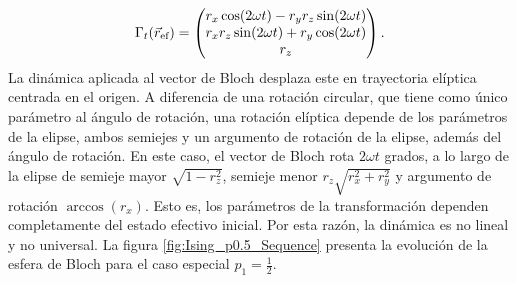 \begin{equation}\label{eq:EffectiveIsing2BV}
    \Gamma_{t}(\vec{r}_{\text{ef}})=\begin{pmatrix}
        r_{x}\cos(2\omega t)-r_{y}r_{z}\sin(2\omega t)\\
        r_{x}r_{z}\sin(2\omega t)+r_{y}\cos(2\omega t)\\
        r_{z}\\
    \end{pmatrix}.
\end{equation}
La dinámica aplicada al vector de Bloch desplaza este en trayectoria elíptica centrada en el origen. A diferencia de una rotación circular, que tiene como único parámetro al ángulo de rotación, una rotación elíptica depende de los parámetros de la elipse, ambos semiejes y un argumento de rotación de la elipse, además del ángulo de rotación. En este caso, el vector de Bloch rota $2\omega t$ grados, a lo largo de la elipse de semieje mayor $\sqrt{1-r_{z}^2}$, semieje menor $r_{z}\sqrt{r_{x}^2+r_{y}^2}$ y argumento de rotación $\arccos(r_{x})$. Esto es, los parámetros de la transformación dependen completamente del estado efectivo inicial. Por esta razón, la dinámica es no lineal y no universal. La figura \ref{fig:Ising_p0.5_Sequence} presenta la evolución de la esfera de Bloch para el caso especial $p_{1}=\frac{1}{2}$. 

